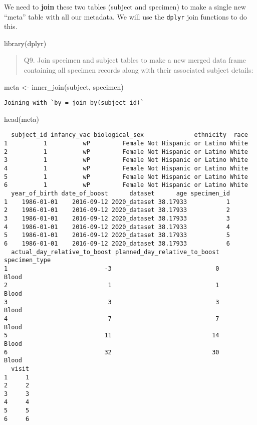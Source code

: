 \documentclass[
  letterpaper,
  DIV=11,
  numbers=noendperiod]{scrartcl}
\newenvironment{Shaded}{\begin{snugshade}}{\end{snugshade}}
\newcommand{\FunctionTok}[1]{\textcolor[rgb]{0.28,0.35,0.67}{#1}}
\newcommand{\NormalTok}[1]{\textcolor[rgb]{0.00,0.23,0.31}{#1}}
\newcommand{\OtherTok}[1]{\textcolor[rgb]{0.00,0.23,0.31}{#1}}
\begin{document}
We need to \textbf{join} these two tables (subject and specimen) to make
a single new ``meta'' table with all our metadata. We will use the
\texttt{dplyr} join functions to do this.

\begin{Shaded}
\begin{Highlighting}[]
\FunctionTok{library}\NormalTok{(dplyr)}
\end{Highlighting}
\end{Shaded}

\begin{quote}
Q9. Join specimen and subject tables to make a new merged data frame
containing all specimen records along with their associated subject
details:
\end{quote}

\begin{Shaded}
\begin{Highlighting}[]
\NormalTok{meta }\OtherTok{\textless{}{-}} \FunctionTok{inner\_join}\NormalTok{(subject, specimen)}
\end{Highlighting}
\end{Shaded}

\begin{verbatim}
Joining with `by = join_by(subject_id)`
\end{verbatim}

\begin{Shaded}
\begin{Highlighting}[]
\FunctionTok{head}\NormalTok{(meta)}
\end{Highlighting}
\end{Shaded}

\begin{verbatim}
  subject_id infancy_vac biological_sex              ethnicity  race
1          1          wP         Female Not Hispanic or Latino White
2          1          wP         Female Not Hispanic or Latino White
3          1          wP         Female Not Hispanic or Latino White
4          1          wP         Female Not Hispanic or Latino White
5          1          wP         Female Not Hispanic or Latino White
6          1          wP         Female Not Hispanic or Latino White
  year_of_birth date_of_boost      dataset      age specimen_id
1    1986-01-01    2016-09-12 2020_dataset 38.17933           1
2    1986-01-01    2016-09-12 2020_dataset 38.17933           2
3    1986-01-01    2016-09-12 2020_dataset 38.17933           3
4    1986-01-01    2016-09-12 2020_dataset 38.17933           4
5    1986-01-01    2016-09-12 2020_dataset 38.17933           5
6    1986-01-01    2016-09-12 2020_dataset 38.17933           6
  actual_day_relative_to_boost planned_day_relative_to_boost specimen_type
1                           -3                             0         Blood
2                            1                             1         Blood
3                            3                             3         Blood
4                            7                             7         Blood
5                           11                            14         Blood
6                           32                            30         Blood
  visit
1     1
2     2
3     3
4     4
5     5
6     6
\end{verbatim}
\end{document}
